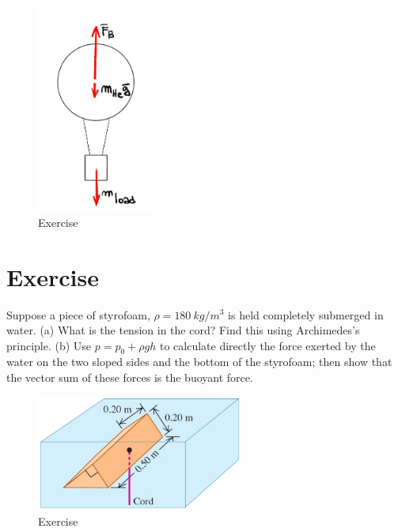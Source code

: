 \documentclass[12pt]{article}
\begin{document}
\begin{figure}[h!]
  \begin{center}
    \includegraphics[height=2.7in]{images/baloom.jpg}
    \caption{Exercise \theexample }
    \label{5}
  \end{center}
\end{figure}




\section*{Exercise \theexample}

Suppose a piece of styrofoam, $\rho=180~kg/m^3$ is
held completely submerged in water. (a) What is the
tension in the cord? Find this using Archimedes’s principle.
(b) Use $p=p_0+\rho g h$ to calculate directly the force exerted by
the water on the two sloped sides and the bottom of the styrofoam;
then show that the vector sum of these forces is the buoyant
force.

\begin{figure}[h!]
  \begin{center}
  \includegraphics[height=1.5in]{images/example_12.97.jpg}
  \caption{Exercise \theexample }
  \label{6}
\end{center}
\end{figure}
\end{document}
